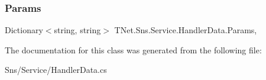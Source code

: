 \mbox{\label{class_t_net_1_1_sns_1_1_service_1_1_handler_data_ad6e44646694cfeb9f528b3f0a7c90178}} 
\subsubsection{\texorpdfstring{Params}{Params}}
{\footnotesize\ttfamily Dictionary$<$string, string$>$ T\+Net.\+Sns.\+Service.\+Handler\+Data.\+Params\hspace{0.3cm}{\ttfamily [get]}, {\ttfamily [set]}}







The documentation for this class was generated from the following file\+:\begin{DoxyCompactItemize}
\item 
Sns/\+Service/Handler\+Data.\+cs\end{DoxyCompactItemize}

